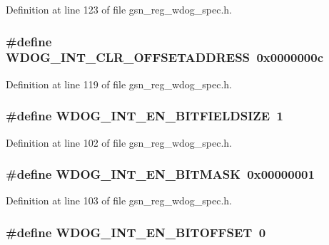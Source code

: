 Definition at line 123 of file gsn\_\-reg\_\-wdog\_\-spec.h.

\hypertarget{a00577_afea286ed7d0b35e534e7eb2e814a933f}{
\subsubsection[{WDOG\_\-INT\_\-CLR\_\-OFFSETADDRESS}]{\setlength{\rightskip}{0pt plus 5cm}\#define WDOG\_\-INT\_\-CLR\_\-OFFSETADDRESS~0x0000000c}}
\label{a00577_afea286ed7d0b35e534e7eb2e814a933f}


Definition at line 119 of file gsn\_\-reg\_\-wdog\_\-spec.h.

\hypertarget{a00577_a13ef79b9ba85aabd21b971dd867cd409}{
\subsubsection[{WDOG\_\-INT\_\-EN\_\-BITFIELDSIZE}]{\setlength{\rightskip}{0pt plus 5cm}\#define WDOG\_\-INT\_\-EN\_\-BITFIELDSIZE~1}}
\label{a00577_a13ef79b9ba85aabd21b971dd867cd409}


Definition at line 102 of file gsn\_\-reg\_\-wdog\_\-spec.h.

\hypertarget{a00577_a5b8c896a6cc197aa720ddfebfcfb61ad}{
\subsubsection[{WDOG\_\-INT\_\-EN\_\-BITMASK}]{\setlength{\rightskip}{0pt plus 5cm}\#define WDOG\_\-INT\_\-EN\_\-BITMASK~0x00000001}}
\label{a00577_a5b8c896a6cc197aa720ddfebfcfb61ad}


Definition at line 103 of file gsn\_\-reg\_\-wdog\_\-spec.h.

\hypertarget{a00577_abdb253bc52e1f6d3fe4be48926cb438c}{
\subsubsection[{WDOG\_\-INT\_\-EN\_\-BITOFFSET}]{\setlength{\rightskip}{0pt plus 5cm}\#define WDOG\_\-INT\_\-EN\_\-BITOFFSET~0}}
\label{a00577_abdb253bc52e1f6d3fe4be48926cb438c}


